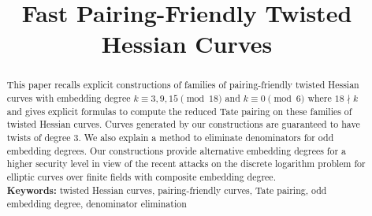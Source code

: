 \documentclass[11pt, a4paper]{article}
\theoremstyle{definition}
\newif\ifpublic
\begin{document}
\title{Fast Pairing-Friendly Twisted Hessian Curves}

\ifpublic
\author{Chitchanok Chuengsatiansup and Chloe Martindale}

\institute{
Department of Mathematics and Computer Science\\
Technische Universiteit Eindhoven\\
P.O. Box 513, 5600 MB Eindhoven, The Netherlands\\
\email{c.chuengsatiansup@tue.nl}
}
\fi
\date{}
\maketitle
\begin{abstract}
This paper recalls explicit constructions of families of pairing-friendly twisted Hessian curves
with embedding degree $k \equiv 3,9,15 \pmod{18}$ and $k \equiv 0 \pmod{6}$ where $18 \nmid k$ and gives explicit formulas to compute the reduced Tate pairing on these families of twisted Hessian curves. Curves generated by our constructions are guaranteed to have twists of degree 3. We also explain a method to eliminate denominators for odd embedding degrees. Our constructions provide alternative embedding degrees for a higher security level in view of the recent attacks on the discrete logarithm problem for elliptic curves over finite fields with composite embedding degree.
\\[10pt]
\textbf{Keywords:}
twisted Hessian curves, pairing-friendly curves, Tate pairing, odd embedding degree, denominator elimination
\end{abstract}








%




\end{document}
